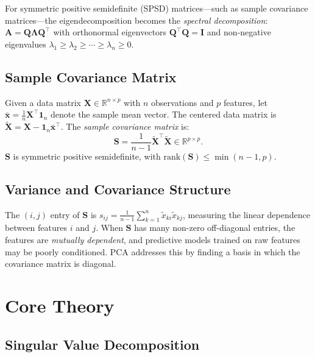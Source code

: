 \documentclass[conference]{IEEEtran}
\begin{document}
For symmetric positive semidefinite (SPSD) matrices—such as sample covariance matrices—the eigendecomposition becomes the \emph{spectral decomposition}: $\mathbf{A} = \mathbf{Q}\mathbf{\Lambda}\mathbf{Q}^\top$ with orthonormal eigenvectors $\mathbf{Q}^\top\mathbf{Q} = \mathbf{I}$ and non-negative eigenvalues $\lambda_1 \geq \lambda_2 \geq \cdots \geq \lambda_n \geq 0$.

\subsection{Sample Covariance Matrix}

Given a data matrix $\mathbf{X} \in \mathbb{R}^{n \times p}$ with $n$ observations and $p$ features, let $\bar{\mathbf{x}} = \frac{1}{n}\mathbf{X}^\top \mathbf{1}_n$ denote the sample mean vector. The centered data matrix is $\tilde{\mathbf{X}} = \mathbf{X} - \mathbf{1}_n \bar{\mathbf{x}}^\top$. The \emph{sample covariance matrix} is:
\begin{equation}
\mathbf{S} = \frac{1}{n-1}\tilde{\mathbf{X}}^\top \tilde{\mathbf{X}} \in \mathbb{R}^{p \times p}.
\end{equation}
$\mathbf{S}$ is symmetric positive semidefinite, with $\mathrm{rank}(\mathbf{S}) \leq \min(n-1, p)$.

\subsection{Variance and Covariance Structure}

The $(i,j)$ entry of $\mathbf{S}$ is $s_{ij} = \frac{1}{n-1}\sum_{k=1}^n \tilde{x}_{ki}\tilde{x}_{kj}$, measuring the linear dependence between features $i$ and $j$. When $\mathbf{S}$ has many non-zero off-diagonal entries, the features are \emph{mutually dependent}, and predictive models trained on raw features may be poorly conditioned. PCA addresses this by finding a basis in which the covariance matrix is diagonal.

\section{Core Theory}
\label{sec:theory}

\subsection{Singular Value Decomposition}
\end{document}
